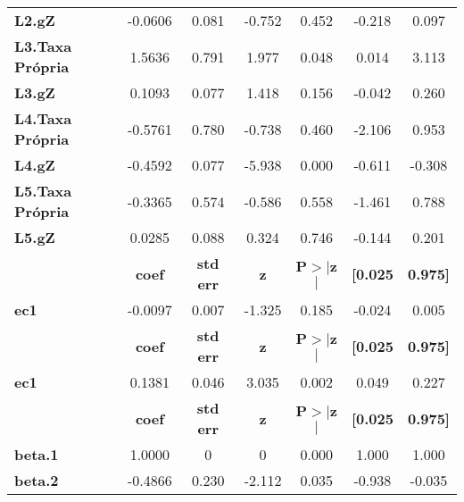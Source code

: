 \begin{center}
\begin{tabular}{lcccccc}
\textbf{L2.gZ}           &      -0.0606  &        0.081     &    -0.752  &         0.452        &       -0.218    &        0.097     \\
\textbf{L3.Taxa Própria} &       1.5636  &        0.791     &     1.977  &         0.048        &        0.014    &        3.113     \\
\textbf{L3.gZ}           &       0.1093  &        0.077     &     1.418  &         0.156        &       -0.042    &        0.260     \\
\textbf{L4.Taxa Própria} &      -0.5761  &        0.780     &    -0.738  &         0.460        &       -2.106    &        0.953     \\
\textbf{L4.gZ}           &      -0.4592  &        0.077     &    -5.938  &         0.000        &       -0.611    &       -0.308     \\
\textbf{L5.Taxa Própria} &      -0.3365  &        0.574     &    -0.586  &         0.558        &       -1.461    &        0.788     \\
\textbf{L5.gZ}           &       0.0285  &        0.088     &     0.324  &         0.746        &       -0.144    &        0.201     \\
             & \textbf{coef} & \textbf{std err} & \textbf{z} & \textbf{P$> |$z$|$} & \textbf{[0.025} & \textbf{0.975]}  \\
\midrule
\textbf{ec1} &      -0.0097  &        0.007     &    -1.325  &         0.185        &       -0.024    &        0.005     \\
             & \textbf{coef} & \textbf{std err} & \textbf{z} & \textbf{P$> |$z$|$} & \textbf{[0.025} & \textbf{0.975]}  \\
\midrule
\textbf{ec1} &       0.1381  &        0.046     &     3.035  &         0.002        &        0.049    &        0.227     \\
                & \textbf{coef} & \textbf{std err} & \textbf{z} & \textbf{P$> |$z$|$} & \textbf{[0.025} & \textbf{0.975]}  \\
\midrule
\textbf{beta.1} &       1.0000  &            0     &         0  &         0.000        &        1.000    &        1.000     \\
\textbf{beta.2} &      -0.4866  &        0.230     &    -2.112  &         0.035        &       -0.938    &       -0.035     \\
\bottomrule
\end{tabular}
\end{center}